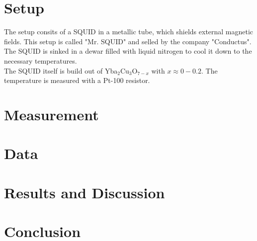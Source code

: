 \documentclass[12pt,a4paper]{article}
\begin{document}
\section{Setup}
The setup consits of a SQUID in a metallic tube, which shields external magnetic fields. This setup is called "Mr. SQUID" and selled by the company "Conductus". The SQUID is sinked in a dewar filled with liquid nitrogen to cool it down to the necessary temperatures. \\
The SQUID itself is build out of Yba$_2$Cu$_3$O$_{7-x}$ with $x \approx 0-0.2$. The temperature is measured with a Pt-100 resistor.


\section{Measurement}
\section{Data}
\section{Results and Discussion}
\section{Conclusion}


\end{document}

